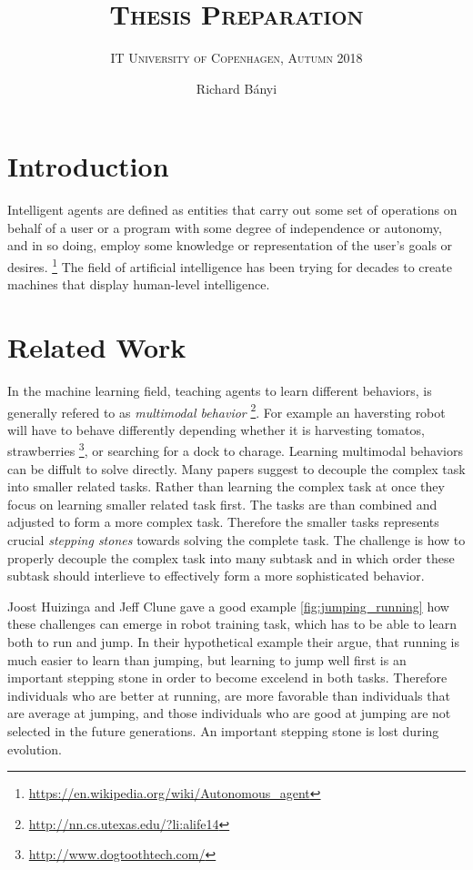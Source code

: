 \documentclass[format=acmsmall, review=false, screen=true]{acmart}
\author{Richard Bányi}
\title{\textsc{Thesis Preparation }}
\subtitle{\textsc{IT University of Copenhagen, Autumn 2018}}
\begin{document}
\maketitle 



\section{Introduction}

Intelligent agents are defined as entities that carry out some set of operations on behalf of a user 
or a program with some degree of independence or autonomy, and in so doing, employ some knowledge or 
representation of the user's goals or desires. \footnote{\url{https://en.wikipedia.org/wiki/Autonomous_agent}}
The field of artificial intelligence has been trying for decades to create machines that display human-level
intelligence.

\section{Related Work}

In the machine learning field, teaching agents to learn different behaviors, is generally refered to as \emph{multimodal behavior} \footnote{\url{http://nn.cs.utexas.edu/?li:alife14}}. For example an haversting robot will have to behave differently depending whether it is harvesting tomatos, strawberries \footnote{\url{http://www.dogtoothtech.com/}}, or searching for a dock to charage. Learning multimodal behaviors can be diffult to solve directly. Many papers suggest to decouple the complex task into smaller related tasks. Rather than learning the complex task at once they focus on learning smaller related task first. The tasks are than combined and adjusted to form a more complex task. Therefore the smaller tasks represents crucial \emph{stepping stones} towards solving the complete task. The challenge is how to properly decouple the complex task into many subtask and in which order these subtask should interlieve to effectively form a more sophisticated behavior.

Joost Huizinga and Jeff Clune gave a good example \ref{fig:jumping_running} how these challenges can emerge in robot training task, which has to be able to learn both to run and jump. In their hypothetical example their argue, that running is much easier to learn than jumping, but learning to jump well first is an important stepping stone in order to become excelend in both tasks. Therefore individuals who are better at running, are more favorable than individuals that are average at jumping, and those individuals who are good at jumping are not selected in the future generations. An important stepping stone is lost during evolution. 
\end{document}
